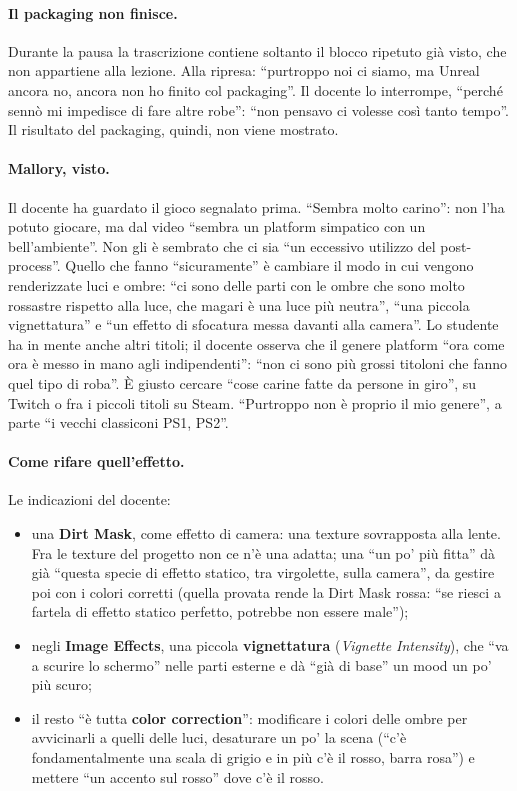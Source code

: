\paragraph{Il packaging non finisce.} Durante la pausa la trascrizione contiene soltanto il
blocco ripetuto già visto, che non appartiene alla lezione. Alla ripresa: ``purtroppo noi ci
siamo, ma Unreal ancora no, ancora non ho finito col packaging''. Il docente lo interrompe,
``perché sennò mi impedisce di fare altre robe'': ``non pensavo ci volesse così tanto tempo''.
Il risultato del packaging, quindi, non viene mostrato.

\paragraph{Mallory, visto.} Il docente ha guardato il gioco segnalato prima. ``Sembra molto
carino'': non l'ha potuto giocare, ma dal video ``sembra un platform simpatico con un bell'ambiente''.
Non gli è sembrato che ci sia ``un eccessivo utilizzo del post-process''. Quello che fanno
``sicuramente'' è cambiare il modo in cui vengono renderizzate luci e ombre: ``ci sono delle parti
con le ombre che sono molto rossastre rispetto alla luce, che magari è una luce più neutra'',
``una piccola vignettatura'' e ``un effetto di sfocatura messa davanti alla camera''. Lo
studente ha in mente anche altri titoli; il docente osserva che il genere platform ``ora come ora
è messo in mano agli indipendenti'': ``non ci sono più grossi titoloni che fanno quel tipo di
roba''. È giusto cercare ``cose carine fatte da persone in giro'', su Twitch o fra i piccoli
titoli su Steam. ``Purtroppo non è proprio il mio genere'', a parte ``i vecchi classiconi PS1,
PS2''.

\paragraph{Come rifare quell'effetto.} Le indicazioni del docente:
\begin{itemize}
  \item una \textbf{Dirt Mask}, come effetto di camera: una texture sovrapposta alla lente. Fra
        le texture del progetto non ce n'è una adatta; una ``un po' più fitta'' dà già ``questa
        specie di effetto statico, tra virgolette, sulla camera'', da gestire poi con i colori
        corretti (quella provata rende la Dirt Mask rossa: ``se riesci a fartela di effetto
        statico perfetto, potrebbe non essere male'');
  \item negli \textbf{Image Effects}, una piccola \textbf{vignettatura} (\emph{Vignette
        Intensity}), che ``va a scurire lo schermo'' nelle parti esterne e dà ``già di base'' un
        mood un po' più scuro;
  \item il resto ``è tutta \textbf{color correction}'': modificare i colori delle ombre per
        avvicinarli a quelli delle luci, desaturare un po' la scena (``c'è fondamentalmente una
        scala di grigio e in più c'è il rosso, barra rosa'') e mettere ``un accento sul rosso''
        dove c'è il rosso.
\end{itemize}

